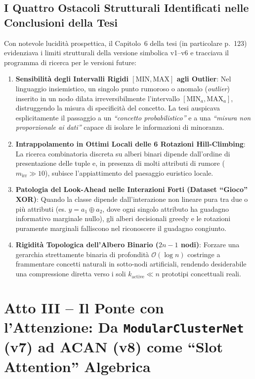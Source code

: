 \documentclass[10pt,a4paper]{article}
\begin{document}
\subsection{I Quattro Ostacoli Strutturali Identificati nelle Conclusioni della Tesi}
Con notevole lucidit\`a prospettica, il Capitolo~6 della tesi (in particolare p.~123) evidenziava i limiti strutturali della versione simbolica v1--v6 e tracciava il programma di ricerca per le versioni future:
\begin{enumerate}
    \item \textbf{Sensibilit\`a degli Intervalli Rigidi $[\text{MIN}, \text{MAX}]$ agli Outlier}: Nel linguaggio insiemistico, un singolo punto rumoroso o anomalo (\textit{outlier}) inserito in un nodo dilata irreversibilmente l'intervallo $[\text{MIN}_a, \text{MAX}_a]$, distruggendo la misura di specificit\`a del concetto. La tesi auspicava esplicitamente il passaggio a un \textit{``concetto probabilistico''} e a una \textit{``misura non proporzionale ai dati''} capace di isolare le informazioni di minoranza.
    \item \textbf{Intrappolamento in Ottimi Locali delle 6 Rotazioni Hill-Climbing}: La ricerca combinatoria discreta su alberi binari dipende dall'ordine di presentazione delle tuple e, in presenza di molti attributi di rumore ($m_{\text{irr}} \gg 10$), subisce l'appiattimento del paesaggio euristico locale.
    \item \textbf{Patologia del Look-Ahead nelle Interazioni Forti (Dataset ``Gioco'' XOR)}: Quando la classe dipende dall'interazione non lineare pura tra due o pi\`u attributi (es. $y = a_1 \oplus a_2$, dove ogni singolo attributo ha guadagno informativo marginale nullo), gli alberi decisionali greedy e le rotazioni puramente marginali falliscono nel riconoscere il guadagno congiunto.
    \item \textbf{Rigidit\`a Topologica dell'Albero Binario ($2n-1$ nodi)}: Forzare una gerarchia strettamente binaria di profondit\`a $\mathcal{O}(\log n)$ costringe a frammentare concetti naturali in sotto-nodi artificiali, rendendo desiderabile una compressione diretta verso i soli $k_{\text{active}} \ll n$ prototipi concettuali reali.
\end{enumerate}

\section{Atto III -- Il Ponte con l'Attenzione: Da \texttt{ModularClusterNet} (v7) ad ACAN (v8) come ``Slot Attention'' Algebrica}
\end{document}
